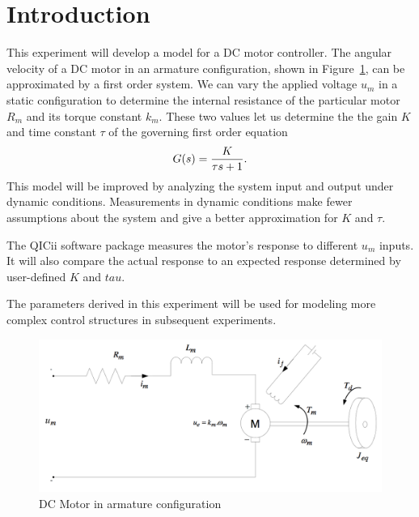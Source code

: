 \section{Introduction}\label{sec:intro}
This experiment will develop a model for a DC motor controller.
The angular velocity of a DC motor in an armature configuration, shown in Figure~\ref{fig:motorschematic}, can be approximated by a first order system.
We can vary the applied voltage $u_m$ in a static configuration to determine the internal resistance of the particular motor $R_m$ and its torque constant $k_m$.
These two values let us determine the the gain $K$ and time constant $\tau$ of the governing first order equation
\begin{equation}\label{eq:tf}
  G(s) = {K \over \tau s + 1}.
\end{equation}
This model will be improved by analyzing the system input and output under dynamic conditions.
Measurements in dynamic conditions make fewer assumptions about the system and give a better approximation for $K$ and $\tau$.

The QICii software package measures the motor's response to different $u_m$ inputs. It will also compare the actual response to an expected response determined by user-defined $K$ and $tau$.

The parameters derived in this experiment will be used for modeling more complex control structures in subsequent experiments.
\begin{figure}[tbph]
  \centering
  \includegraphics[width=0.7\linewidth]{graphics/motorSchematic}
  \caption{DC Motor in armature configuration}
  \label{fig:motorschematic}
\end{figure}


